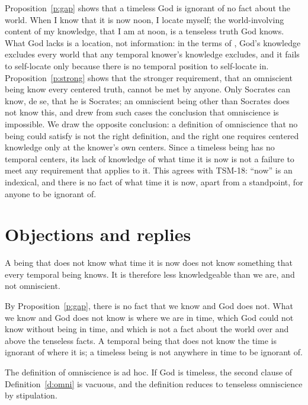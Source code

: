 \documentclass{situationist-preprint}
\begin{document}
Proposition~\ref{p:gap} shows that a timeless God is ignorant of no fact about the world. When I know that it is now noon, I locate myself; the world-involving content of my knowledge, that I am at noon, is a tenseless truth God knows. What God lacks is a location, not information: in the terms of \citet{Lewis1979}, God's knowledge excludes every world that any temporal knower's knowledge excludes, and it fails to self-locate only because there is no temporal position to self-locate in. Proposition~\ref{p:strong} shows that the stronger requirement, that an omniscient being know every centered truth, cannot be met by anyone. Only Socrates can know, de se, that he is Socrates; an omniscient being other than Socrates does not know this, and \citet{Grim1985} drew from such cases the conclusion that omniscience is impossible. We draw the opposite conclusion: a definition of omniscience that no being could satisfy is not the right definition, and the right one requires centered knowledge only at the knower's own centers. Since a timeless being has no temporal centers, its lack of knowledge of what time it is now is not a failure to meet any requirement that applies to it. This agrees with TSM-18: \enquote{now} is an indexical, and there is no fact of what time it is now, apart from a standpoint, for anyone to be ignorant of.

\section{Objections and replies}

\begin{objection}[Kretzmann]
A being that does not know what time it is now does not know something that every temporal being knows. It is therefore less knowledgeable than we are, and not omniscient.
\end{objection}

\begin{reply}
By Proposition~\ref{p:gap}, there is no fact that we know and God does not. What we know and God does not know is where we are in time, which God could not know without being in time, and which is not a fact about the world over and above the tenseless facts. A temporal being that does not know the time is ignorant of where it is; a timeless being is not anywhere in time to be ignorant of.
\end{reply}

\begin{objection}
The definition of omniscience is ad hoc. If God is timeless, the second clause of Definition~\ref{d:omni} is vacuous, and the definition reduces to tenseless omniscience by stipulation.
\end{objection}
\end{document}
